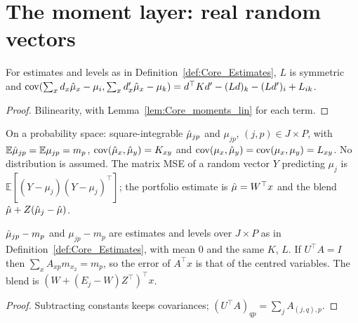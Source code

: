 \section*{The moment layer: real random vectors}

\begin{lemma}\label{lem:CV_moments_lin}
  \leanok
  For estimates and levels as in Definition~\ref{def:Core_Estimates}, $L$ is symmetric and
  $\operatorname{cov}(\sum_x d_x\hat\mu_x - \mu_i, \sum_x d'_x\hat\mu_x - \mu_k)
  = d^\top Kd' - (Ld)_k - (Ld')_i + L_{ik}$.
\end{lemma}
\begin{proof}
  \leanok
  Bilinearity, with Lemma~\ref{lem:Core_moments_lin} for each term.
\end{proof}

\begin{definition}\label{def:CV_Estimates}
  \leanok
  On a probability space: square-integrable $\hat\mu_{jp}$ and $\mu_{jp}$, $(j,p) \in J \times P$,
  with $\mathbb E\hat\mu_{jp} = \mathbb E\mu_{jp} = m_p$, $\operatorname{cov}(\hat\mu_x, \hat\mu_y) = K_{xy}$ and
  $\operatorname{cov}(\mu_x, \hat\mu_y) = \operatorname{cov}(\mu_x, \mu_y) = L_{xy}$. No distribution is assumed. The matrix
  MSE of a random vector $Y$ predicting $\mu_j$ is $\mathbb E[(Y - \mu_j)(Y - \mu_j)^\top]$;
  the portfolio estimate is $\hat\mu = W^\top x$ and the blend $\hat\mu + Z(\hat\mu_j - \hat\mu)$.
\end{definition}

\begin{lemma}\label{lem:CV_centred}
  \leanok
  $\hat\mu_{jp} - m_p$ and $\mu_{jp} - m_p$ are estimates and levels over $J \times P$ as in
  Definition~\ref{def:Core_Estimates}, with mean $0$ and the same $K$, $L$. If $U^\top A = I$
  then $\sum_x A_{xp}m_{x_2} = m_p$, so the error of $A^\top x$ is that of the centred
  variables. The blend is $(W + (E_j - W)Z^\top)^\top x$.
\end{lemma}
\begin{proof}
  \leanok
  Subtracting constants keeps covariances; $(U^\top A)_{qp} = \sum_j A_{(j,q),p}$.
\end{proof}

